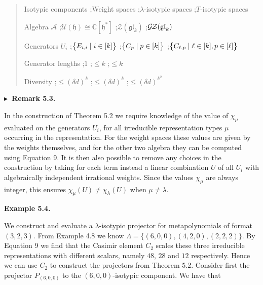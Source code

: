 \documentclass[10pt,a4paper]{article}
\begin{document}
\begin{quote}
Isotypic components \quad;\quad Weight spaces \quad;\quad $\lambda$-isotypic spaces \quad;\quad $T$-isotypic spaces\par
Algebra $\mathcal{A}$ \quad;\quad $\mathcal{U}(\mathfrak{h})\cong\mathbb{C}[\mathfrak{h}^{*}]$ \quad;\quad $\mathcal{Z}(\mathfrak{gl}_{k})$ \quad;\quad $\mathcal{G}\hskip-1.00006pt\mathcal{Z}(\mathfrak{gl}_{k})$\par
Generators $U_{i}$ \quad;\quad $\big{\{}E_{i,i}\mid i\in[k]\big{\}}$ \quad;\quad $\big{\{}C_{p}\mid p\in[k]\big{\}}$ \quad;\quad $\big{\{}C_{\ell,p}\mid\ell\in[k],p\in[\ell]\big{\}}$\par
Generator lengths \quad;\quad $1$ \quad;\quad $\leq k$ \quad;\quad $\leq k$\par
Diversity \quad;\quad $\leq(\delta d)^{k}$ \quad;\quad $\leq(\delta d)^{k}$ \quad;\quad $\leq(\delta d)^{k^{2}}$\par
\end{quote}




\par\medskip\noindent\textbf{$\blacktriangleright$ Remark 5.3.}\par



In the construction of Theorem 5.2 we require knowledge of the value of $\chi_{\mu}$ evaluated on the generators $U_{i}$, for all irreducible representation types $\mu$ occurring in the representation.
For the weight spaces these values are given by the weights themselves, and for the other two algebra they can be computed using Equation 9.
It is then also possible to remove any choices in the construction by taking for each term instead a linear combination $U$ of all $U_{i}$ with algebraically independent irrational weights.
Since the values $\chi_{\mu}$ are always integer, this ensures $\chi_{\mu}(U)\neq\chi_{\lambda}(U)$ when $\mu\neq\lambda$.






\par\medskip\noindent\textbf{Example 5.4.}\par



We construct and evaluate a $\lambda$-isotypic projector for metapolynomials of format $(3,2,3)$.
From Example 4.8 we know $\Lambda=\{(6,0,0),(4,2,0),(2,2,2)\}$.
By Equation 9 we find that the Casimir element $C_{2}$ scales these three irreducible representations with different scalars, namely $48$, $28$ and $12$ respectively.
Hence we can use $C_{2}$ to construct the projectors from Theorem 5.2.
Consider first the projector $P_{(6,0,0)}$ to the $(6,0,0)$-isotypic component.
We have that
\end{document}
